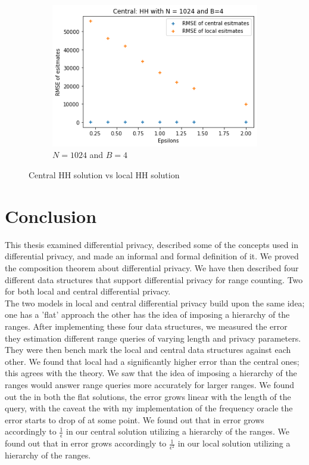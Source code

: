 \documentclass[11pt]{article}
\theoremstyle{definition}
\begin{document}
\begin{figure}[H]
\begin{subfigure}{.3\textwidth}
  \includegraphics[width=\linewidth]{figures/cen_vs_loc/hh/hh_beat_flat=1024_B=4.png}
  \caption{$N=1024$ and $B=4$}
  \label{fig:hh_vs1024}
\end{subfigure}
\caption{Central HH solution vs local HH solution}
\label{fig:hhhh_flat}
\end{figure}
\section{Conclusion}
This thesis examined differential privacy, described some of the concepts used in differential privacy, and made an informal and formal definition of it. We proved the composition theorem about differential privacy. We have then described four different data structures that support differential privacy for range counting. Two for both local and central differential privacy. \\
The two models in local and central differential privacy build upon the same idea; one has a 'flat' approach the other has the idea of imposing a hierarchy of the ranges. 
After implementing these four data structures, we measured the error they estimation different range queries of varying length and privacy parameters. They were then bench mark the local and central data structures against each other. We found that local had a significantly higher error than the central ones; this agrees with the theory. We saw that the idea of imposing a hierarchy of the ranges would answer range queries more accurately for larger ranges. We found out the in both the flat solutions, the error grows linear with the length of the query, with the caveat the with my implementation of the frequency oracle the error starts to drop of at some point. We found out that in error grows accordingly to $\frac{1}{\epsilon}$ in our central solution utilizing a hierarchy of the ranges. 
We found out that in error grows accordingly to $\frac{1}{\epsilon^2}$ in our local solution utilizing a hierarchy of the ranges. 
\end{document}
